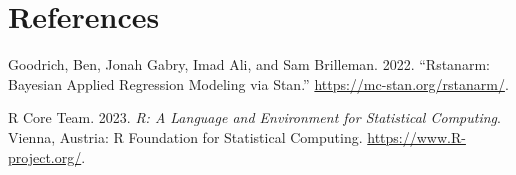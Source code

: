 \documentclass[
  letterpaper,
  DIV=11,
  numbers=noendperiod]{scrartcl}
\newlength{\cslhangindent}
\newlength{\cslentryspacingunit} %
\newenvironment{CSLReferences}[2] %
 {%
  \setlength{\parindent}{0pt}
  \ifodd #1
  \let\oldpar\par
  \def\par{\hangindent=\cslhangindent\oldpar}
  \fi
  \setlength{\parskip}{#2\cslentryspacingunit}
 }%
 {}
\begin{document}
\newpage

\hypertarget{references}{%
\section*{References}\label{references}}

\hypertarget{refs}{}
\begin{CSLReferences}{1}{0}
\leavevmode{}%
Goodrich, Ben, Jonah Gabry, Imad Ali, and Sam Brilleman. 2022.
{``Rstanarm: {Bayesian} Applied Regression Modeling via {Stan}.''}
\url{https://mc-stan.org/rstanarm/}.

\leavevmode{}%
R Core Team. 2023. \emph{R: A Language and Environment for Statistical
Computing}. Vienna, Austria: R Foundation for Statistical Computing.
\url{https://www.R-project.org/}.

\end{CSLReferences}
\end{document}
